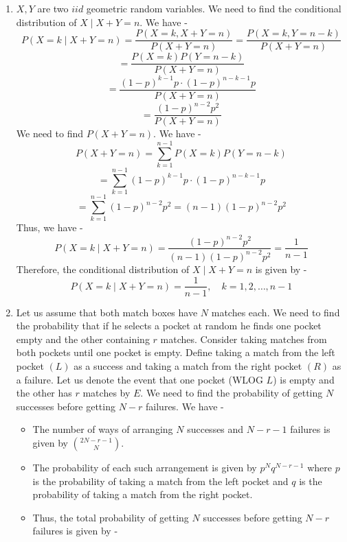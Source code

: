 \begin{enumerate}
    We know that the modes of a Poisson distribution occur at $\lfloor \lambda \rfloor$ and $\lfloor \lambda \rfloor - 1$ if $\lambda$ is an integer. Since the modes are at 1 and 2, we have $\lambda = 2$. Thus, we have -
    \[P(X=1 \text{ or } X=2) = P(X=1) + P(X=2)\]
    \[= \frac{e^{-\lambda} \lambda^1}{1!} + \frac{e^{-\lambda} \lambda^2}{2!}\]
    \[\boxed{= \frac{e^{-2} (2)^1}{1!} + \frac{e^{-2} (2)^2}{2!} = 2e^{-2} + 2e^{-2} = 4e^{-2} \approx 0.5413
    }\]
    \item $X, Y$ are two $iid$ geometric random variables. We need to find the conditional distribution of $X\mid X + Y = n$. We have -
    \[P(X = k \mid X + Y = n) = \frac{P(X = k, X + Y = n)}{P(X + Y = n)} = \frac{P(X = k, Y = n - k)}{P(X + Y = n)}\]
    \[= \frac{P(X = k) P(Y = n - k)}{P(X + Y = n)}\]
    \[= \frac{(1 - p)^{k-1} p \cdot (1 - p)^{n-k-1} p}{P(X + Y = n)}\]
    \[= \frac{(1 - p)^{n-2} p^2}{P(X + Y = n)}\]
    We need to find $P(X + Y = n)$. We have -
    \[P(X + Y = n) = \sum_{k=1}^{n-1} P(X = k) P(Y = n - k)\]
    \[= \sum_{k=1}^{n-1} (1 - p)^{k-1} p \cdot (1 - p)^{n-k-1} p\]
    \[= \sum_{k=1}^{n-1} (1 - p)^{n-2} p^2 = (n-1) (1 - p)^{n-2} p^2\]
    Thus, we have -
    \[P(X = k \mid X + Y = n) = \frac{(1 - p)^{n-2} p^2}{(n-1) (1 - p)^{n-2} p^2} = \frac{1}{n-1}\]
    Therefore, the conditional distribution of $X\mid X + Y = n$ is given by -
    \[\boxed{P(X = k \mid X + Y = n) = \frac{1}{n-1}, \quad k = 1, 2, \ldots, n-1
    }\]
    \item Let us assume that both match boxes have $N$ matches each. We need to find the probability that if he selects a pocket at random he finds one pocket empty and the other containing $r$ matches. Consider taking matches from both pockets until one pocket is empty. Define taking a match from the left pocket $(L)$ as a success and taking a match from the right pocket $(R)$ as a failure. Let us denote the event that one pocket (WLOG $L$) is empty and the other has $r$ matches by $E$. We need to find the probability of getting $N$ successes before getting $N-r$ failures. We have - 
    \begin{itemize}
        \item The number of ways of arranging $N$ successes and $N-r-1$ failures is given by $\binom{2N - r - 1}{N}$.
        \item The probability of each such arrangement is given by $p^N q^{N-r-1}$ where $p$ is the probability of taking a match from the left pocket and $q$ is the probability of taking a match from the right pocket.
        \item Thus, the total probability of getting $N$ successes before getting $N-r$ failures is given by -

\end{itemize}
\end{enumerate}
